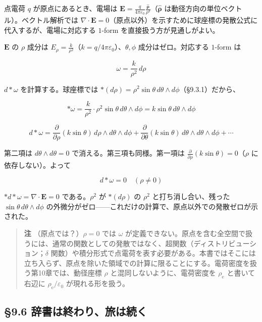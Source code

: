 \documentclass[a4paper,12pt,openany]{book}
\begin{document}
点電荷 \(q\) が原点にあるとき、電場は
\(\mathbf{E} = \frac{q}{4\pi\varepsilon_0}\frac{\hat{\boldsymbol{\rho}}}{\rho^2}\)（\(\hat{\boldsymbol{\rho}}\)
は動径方向の単位ベクトル）。ベクトル解析では
\(\nabla\cdot\mathbf{E} = 0\)（原点以外）を示すために球座標の発散公式に代入するが、電場に対応する
\(1\)-form を直接扱う方が見通しがよい。

\(\mathbf{E}\) の \(\rho\) 成分は
\(E_\rho = \frac{k}{\rho^2}\)（\(k = q/4\pi\varepsilon_0\)）、\(\theta,\phi\)
成分はゼロ。対応する \(1\)-form は

\[\omega = \frac{k}{\rho^2}\,d\rho\]

\(d\ast\omega\) を計算する。球座標では
\(\ast(d\rho) = \rho^2\sin\theta\,d\theta\wedge d\phi\)（§9.3.1）だから、

\[\ast\omega = \frac{k}{\rho^2} \cdot \rho^2\sin\theta\,d\theta\wedge d\phi = k\sin\theta\,d\theta\wedge d\phi\]

\[d\ast\omega = \frac{\partial}{\partial\rho}(k\sin\theta)\,d\rho\wedge d\theta\wedge d\phi + \frac{\partial}{\partial\theta}(k\sin\theta)\,d\theta\wedge d\theta\wedge d\phi + \cdots\]

第二項は \(d\theta\wedge d\theta = 0\) で消える。第三項も同様。第一項は
\(\frac{\partial}{\partial\rho}(k\sin\theta) = 0\)（\(\rho\)
に依存しない）。よって

\[d\ast\omega = 0 \quad (\rho \neq 0)\]

\(\ast d\ast\omega = \nabla\cdot\mathbf{E} = 0\) である。\(\rho^2\) が
\(\ast(d\rho)\) の \(\rho^2\) と打ち消し合い、残った
\(\sin\theta\,d\theta\wedge d\phi\)
の外微分がゼロ——これだけの計算で、原点以外での発散ゼロが示された。

\begin{quote}
\textbf{注} （原点では？）\(\rho = 0\) では \(\omega\)
が定義できない。原点を含む全空間で扱うには、通常の関数としての発散ではなく、超関数（ディストリビューション；\(\delta\)
関数）や積分形式で点電荷を表す必要がある。本書ではそこには立ち入らず、原点を除いた領域での計算に限ることにする。電荷密度を扱う第10章では、動径座標
\(\rho\) と混同しないように、電荷密度を \(\rho_{\mathrm e}\)
と書いて右辺に \(\rho_{\mathrm e}/\varepsilon_0\) が現れる形を扱う。
\end{quote}

\par\vspace{0.35em}\par

\hypertarget{ux8f9eux66f8ux306fux7d42ux308fux308aux65c5ux306fux7d9aux304f}{%
\subsection{§9.6
辞書は終わり、旅は続く}\label{ux8f9eux66f8ux306fux7d42ux308fux308aux65c5ux306fux7d9aux304f}}
\end{document}
